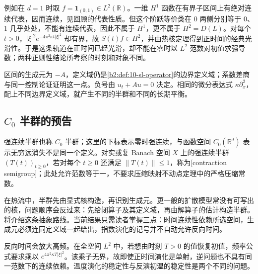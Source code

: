 例如在 \(d=1\) 时取 \(f=\mathbf1_{(0,1)}\in L^2(\mathbb R)\)。一维 \(H^1\) 函数在有界子区间上有绝对连续代表，因而连续，见回顾的代表性质。但这个阶跃等价类在 \(0\) 两侧分别等于 \(0\)、\(1\) 几乎处处，不能有连续代表，因此不属于 \(H^1\)，更不属于 \(H^2=D(L)\)。对每个 \(t>0\)，\(|\xi|^2e^{-4\pi^2\kappa t|\xi|^2}\) 却有界，故 \(S(t)f\in H^2\)，并由热核定理得到正时间的经典光滑性。于是这条轨道在正时间已经光滑，却不能在零时以 \(L^2\) 范数对初值求强导数；两种正则性结论所考察的时刻和对象不同。

\ProseParagraphBreak

区间的生成元为 \(-A\)，定义域仍是\cref{b2:def:10-sl-operator}的边界定义域；系数差商与同一控制论证证明这一点。负号由 \(u_t+Au=0\) 决定。相同的微分表达式 \(\kappa\partial_x^2\)，配上不同边界定义域，就产生不同的半群和不同的长期平衡。

\subsection{\texorpdfstring{\(C_0\)}{C0} 半群的预告}
\label{b2:subsec:120404}

强连续半群也称 \(C_0\) 半群；这里的下标表示零时强连续，与函数空间 \(C_0(\mathbb R^d)\) 表示无穷远消失不是同一个定义。对实或复 Banach 空间 \(X\) 上的强连续半群 \((T(t))_{t\ge0}\)，若对每个 \(t\ge0\) 还满足 \(\|T(t)\|\leq1\)，称为[contraction semigroup]；此处允许范数等于一，不要求压缩映射不动点定理中的严格压缩常数。

\ProseParagraphBreak

在热流中，半群先由显式核构造，再识别生成元。更一般的扩散模型常没有可写出的核，问题顺序会反过来：先给闭算子及其定义域，再由解算子的估计构造半群。将介绍这条抽象路线。当前结果只需读者掌握三点：时间连续性依赖所选空间，生成元必须连同定义域一起给出，指数演化的记号并不自动允许反向时间。

\ProseParagraphBreak

反向时间会放大高频。在全空间 \(L^2\) 中，若想由时刻 \(T>0\) 的值恢复初值，频率公式要求乘以 \(e^{4\pi^2\kappa T|\xi|^2}\)。该乘子无界，故即使正时间演化是单射，逆问题也不具有同一范数下的连续依赖。温度演化的稳定性与反演初温的稳定性是两个不同的问题。
